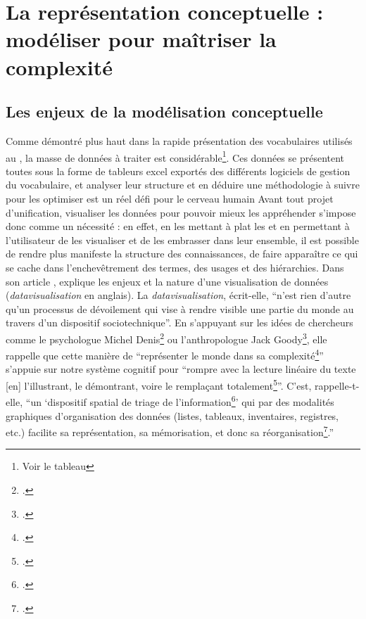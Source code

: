 \section{\label{III-A-1}La représentation conceptuelle : modéliser pour maîtriser la complexité}

\subsection{Les enjeux de la modélisation conceptuelle}

Comme démontré plus haut dans la rapide présentation des vocabulaires utilisés au \mae, la masse de données à traiter est considérable\footnote{Voir le tableau }. Ces données se présentent toutes sous la forme de tableurs excel exportés des différents logiciels de gestion du vocabulaire, et analyser leur structure et en déduire une méthodologie à suivre pour les optimiser est un réel défi pour le cerveau humain
Avant tout projet d'unification, visualiser les données pour pouvoir mieux les appréhender s’impose donc comme un nécessité : en effet, en les mettant à plat les et en permettant à l'utilisateur de les visualiser et de les embrasser dans leur ensemble, il est possible de rendre plus manifeste la structure des connaissances, de faire apparaître ce qui se cache dans l’enchevêtrement des termes, des usages et des hiérarchies.
Dans son article , \citeauthor{arruabarrenaDatavisualisationPrincipesEnjeux2015} explique les enjeux et la nature d'une visualisation de données (\textit{datavisualisation} en anglais). La \textit{datavisualisation}, écrit-elle, \enquote{n’est rien d’autre qu’un processus de dévoilement qui vise à rendre visible une partie du monde au travers d’un dispositif sociotechnique}. En s'appuyant sur les idées de chercheurs comme le psychologue Michel Denis\footcite{denisImageCognition1989} ou l'anthropologue Jack Goody\footcite{goodyDomesticationSavageMind1977}, elle rappelle que cette manière de \enquote{représenter le monde dans sa complexité\footcite{arruabarrenaDatavisualisationPrincipesEnjeux2015}} s'appuie sur notre système cognitif pour \enquote{rompre avec la lecture linéaire du texte [en] l’illustrant, le démontrant, voire le remplaçant totalement\footcite{arruabarrenaDatavisualisationPrincipesEnjeux2015}}. C'est, rappelle-t-elle, \enquote{un \enquote{dispositif spatial de triage de l’information\footcite{goodyDomesticationSavageMind1977}} qui par des modalités graphiques d’organisation des données (listes, tableaux, inventaires, registres, etc.) facilite sa représentation, sa mémorisation, et donc sa réorganisation\footcite{arruabarrenaDatavisualisationPrincipesEnjeux2015}.}

